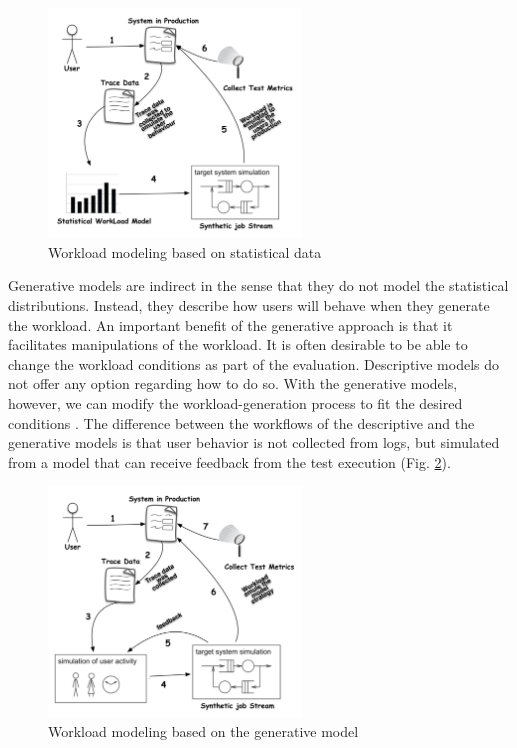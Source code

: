 \documentclass[espaco=umemeio,chapter=TITLE,twoside,openright]{abnt}
\begin{document}
\begin{figure}[!ht]

\centering
\includegraphics[width=0.6\textwidth]{./images/workloadmodel1300dpi.png}
\caption{Workload modeling based on statistical data \cite{DiLucca2006}}
\label{fig:descriptivemodel}
\end{figure}


Generative models are indirect in the sense that they do not model the statistical distributions. Instead, they describe how users will behave when they generate the workload. An important benefit of the generative approach is that it facilitates manipulations of the workload. It is often desirable to be able to change the workload conditions as part of the evaluation. Descriptive models do not offer any option regarding how to do so. With the generative models, however, we can modify the workload-generation process to fit the desired conditions \cite{Feitelson2013}. The difference between the workflows of the descriptive and the generative models is that user behavior is not collected from logs, but simulated from a model that can receive feedback from the test execution (Fig. \ref{fig:generativemodel}).


\begin{figure}[h]
\centering
\includegraphics[width=0.6\textwidth]{./images/workloadmodel2300dpi.png}
\caption{Workload modeling based on the generative model \cite{DiLucca2006}}
\label{fig:generativemodel}

\end{figure}
\end{document}
